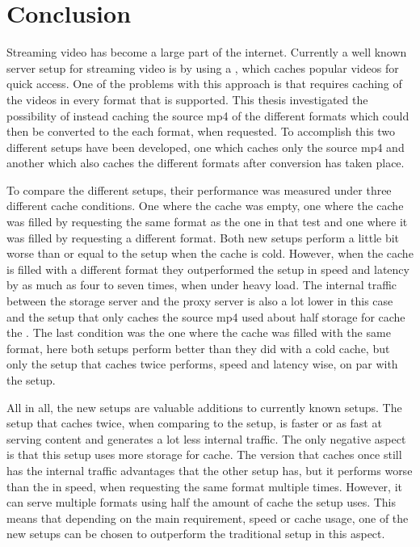 \documentclass[twoside,openright]{uva-bachelor-thesis}
\begin{document}
\chapter{Conclusion}
Streaming video has become a large part of the internet. Currently a well
known server setup for streaming video is by using a \cdn, which caches popular
videos for quick access. One of the problems with this approach is that requires
caching of the videos in every format that is supported. This thesis
investigated the possibility of instead caching the source mp4 of the different
formats which could then be converted to the each format, when requested.
To accomplish this two different setups have been developed, one which caches
only the source mp4 and another which also caches the different formats after
conversion has taken place.

To compare the different setups, their performance was measured under three
different cache conditions. One where the cache was empty, one where the cache
was filled by requesting the same format as the one in that test and one where
it was filled by requesting a different format. Both new setups perform a little
bit worse than or equal to the \cdn setup when the cache is cold.  However, when
the cache is filled with a different format they outperformed the \cdn setup in
speed and latency by as much as four to seven times, when under heavy load. The
internal traffic between the storage server and the proxy server is also a lot
lower in this case and the setup that only caches the source mp4 used about half
storage for cache the \cdn. The last condition was the one where the cache was
filled with the same format, here both setups perform better than they did with
a cold cache, but only the setup that caches twice performs, speed and latency
wise, on par with the \cdn setup.

All in all, the new setups are valuable additions to currently known setups. The
setup that caches twice, when comparing to the \cdn setup, is faster or as
fast at serving content and generates a lot less internal traffic. The only
negative aspect is that this setup uses more storage for cache. The version that
caches once still has the internal traffic advantages that the other setup has,
but it performs worse than the \cdn in speed, when requesting the same format
multiple times. However, it can serve multiple formats using half the amount of
cache the \cdn setup uses. This means that depending on the main requirement,
speed or cache usage, one of the new setups can be chosen to outperform the
traditional \cdn setup in this aspect.
\end{document}
